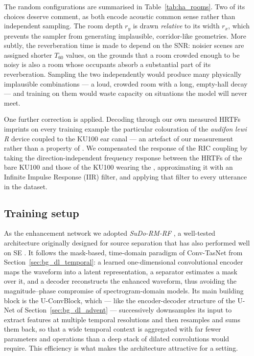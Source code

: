\vspace{1cm}

The random configurations are summarised in Table~\ref{tab:ha_rooms}. Two of its
choices deserve comment, as both encode acoustic common sense rather than
independent sampling. The room depth $r_y$ is drawn \emph{relative} to its
width $r_x$, which prevents the sampler from generating implausible,
corridor-like geometries. More subtly, the reverberation time is made to depend
on the \acrshort{SNR}: noisier scenes are assigned shorter $T_{60}$ values, on
the grounds that a room crowded enough to be noisy is also a room whose
occupants absorb a substantial part of its reverberation. Sampling the two
independently would produce many physically implausible combinations --- a
loud, crowded room with a long, empty-hall decay --- and training on them would
waste capacity on situations the model will never meet.

One further correction is applied. Decoding through our own measured
\acrshort{HRTF}s imprints on every training example the particular colouration
of the \emph{audifon lewi R} device coupled to the \acrshort{KU100} ear canal
--- an artefact of our measurement rather than a property of . We compensated the response of the \acrshort{RIC} coupling by taking the direction-independent frequency response between the
\acrshort{HRTF}s of the bare \acrshort{KU100} and those of the \acrshort{KU100}
wearing the , approximating it with an Infinite Impulse Response (IIR) filter, and
applying that filter to every utterance in the dataset.

\subsection{Training setup}
\label{sec:ha_training}

As the enhancement network we adopted \emph{SuDo-RM-RF} \citep{tzinis2020sudo},
a well-tested architecture originally designed for source separation
that has also performed well on  \acrshort{SE} \citep{leecitear, clarity}. 
It follows the mask-based, time-domain paradigm of
Conv-TasNet \citep{luo2019conv} from  Section~\ref{sec:bg_dl_temporal}: a learned one-dimensional
convolutional encoder maps the waveform into a latent representation, a
separator estimates a mask over it, and a decoder reconstructs the enhanced
waveform, thus avoiding the magnitude--phase compromise of spectrogram-domain
models. Its main building block is the U-ConvBlock, which --- like the encoder-decoder structure
of the U-Net of Section~\ref{sec:bg_dl_advent} --- successively downsamples its
input to extract features at multiple temporal resolutions and then resamples
and sums them back, so that a wide temporal context is aggregated with far
fewer parameters and operations than a deep stack of dilated convolutions would
require. This efficiency is what makes the architecture attractive for a
 setting.


